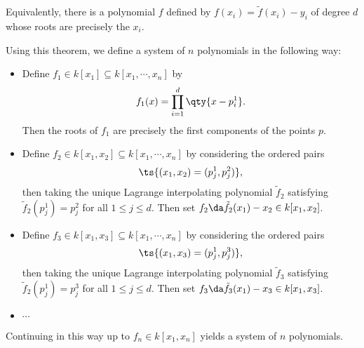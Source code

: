 \begin{solution}
\begin{theorem}[Lagrange]
Equivalently, there is a polynomial \(f\) defined by
\(f(x_i) = \tilde f(x_i) - y_i\) of degree \(d\) whose roots are
precisely the \(x_i\).

\end{theorem}

\vspace{2em}

Using this theorem, we define a system of \(n\) polynomials in the
following way:

\begin{itemize}
\item
  Define \(f_1 \in k[x_1] \subseteq k[x_1, \cdots, x_n]\) by
  \begin{align*}f_1(x) = \prod_{i=1}^d \qty{x - p_i^1}.\end{align*} Then
  the roots of \(f_1\) are precisely the first components of the points
  \(p\).

  \hfill\break
\item
  Define \(f_2 \in k[x_1, x_2] \subseteq k[x_1, \cdots, x_n]\) by
  considering the ordered pairs
  \begin{align*}\ts{(x_1, x_2) = (p_j^1, p_j^2)},\end{align*} then
  taking the unique Lagrange interpolating polynomial \(\tilde f_2\)
  satisfying \(\tilde f_2(p_j^1) = p_j^2\) for all \(1\leq j \leq d\).
  Then set \(f_2 \da \tilde f_2(x_1) - x_2 \in k[x_1, x_2]\).
\end{itemize}

\hfill\break

\begin{itemize}
\item
  Define \(f_3 \in k[x_1, x_3] \subseteq k[x_1, \cdots, x_n]\) by
  considering the ordered pairs
  \begin{align*}\ts{(x_1, x_3) = (p_j^1, p_j^3)},\end{align*} then
  taking the unique Lagrange interpolating polynomial \(\tilde f_3\)
  satisfying \(\tilde f_2(p_j^1) = p_j^3\) for all \(1\leq j \leq d\).
  Then set \(f_3 \da \tilde f_3(x_1) - x_3 \in k[x_1, x_3]\).
\item
  \(\cdots\)
\end{itemize}

\vspace{2em}

Continuing in this way up to \(f_n \in k[x_1, x_n]\) yields a system of
\(n\) polynomials.

\hfill\break

\begin{proposition}


\end{proposition}
\end{solution}
